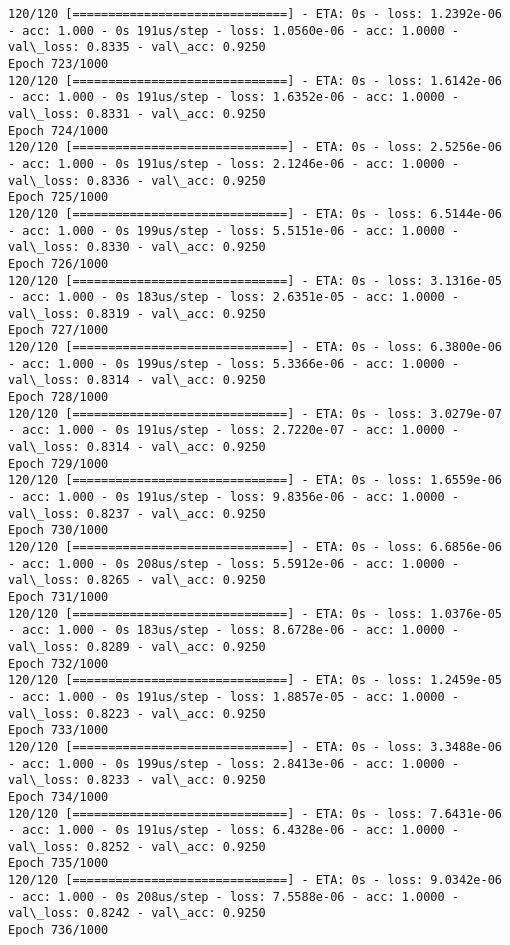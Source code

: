 \documentclass[11pt]{article}
\begin{document}
\begin{Verbatim}[commandchars=\\\{\}]
120/120 [==============================] - ETA: 0s - loss: 1.2392e-06 - acc: 1.000 - 0s 191us/step - loss: 1.0560e-06 - acc: 1.0000 - val\_loss: 0.8335 - val\_acc: 0.9250
Epoch 723/1000
120/120 [==============================] - ETA: 0s - loss: 1.6142e-06 - acc: 1.000 - 0s 191us/step - loss: 1.6352e-06 - acc: 1.0000 - val\_loss: 0.8331 - val\_acc: 0.9250
Epoch 724/1000
120/120 [==============================] - ETA: 0s - loss: 2.5256e-06 - acc: 1.000 - 0s 191us/step - loss: 2.1246e-06 - acc: 1.0000 - val\_loss: 0.8336 - val\_acc: 0.9250
Epoch 725/1000
120/120 [==============================] - ETA: 0s - loss: 6.5144e-06 - acc: 1.000 - 0s 199us/step - loss: 5.5151e-06 - acc: 1.0000 - val\_loss: 0.8330 - val\_acc: 0.9250
Epoch 726/1000
120/120 [==============================] - ETA: 0s - loss: 3.1316e-05 - acc: 1.000 - 0s 183us/step - loss: 2.6351e-05 - acc: 1.0000 - val\_loss: 0.8319 - val\_acc: 0.9250
Epoch 727/1000
120/120 [==============================] - ETA: 0s - loss: 6.3800e-06 - acc: 1.000 - 0s 199us/step - loss: 5.3366e-06 - acc: 1.0000 - val\_loss: 0.8314 - val\_acc: 0.9250
Epoch 728/1000
120/120 [==============================] - ETA: 0s - loss: 3.0279e-07 - acc: 1.000 - 0s 191us/step - loss: 2.7220e-07 - acc: 1.0000 - val\_loss: 0.8314 - val\_acc: 0.9250
Epoch 729/1000
120/120 [==============================] - ETA: 0s - loss: 1.6559e-06 - acc: 1.000 - 0s 191us/step - loss: 9.8356e-06 - acc: 1.0000 - val\_loss: 0.8237 - val\_acc: 0.9250
Epoch 730/1000
120/120 [==============================] - ETA: 0s - loss: 6.6856e-06 - acc: 1.000 - 0s 208us/step - loss: 5.5912e-06 - acc: 1.0000 - val\_loss: 0.8265 - val\_acc: 0.9250
Epoch 731/1000
120/120 [==============================] - ETA: 0s - loss: 1.0376e-05 - acc: 1.000 - 0s 183us/step - loss: 8.6728e-06 - acc: 1.0000 - val\_loss: 0.8289 - val\_acc: 0.9250
Epoch 732/1000
120/120 [==============================] - ETA: 0s - loss: 1.2459e-05 - acc: 1.000 - 0s 191us/step - loss: 1.8857e-05 - acc: 1.0000 - val\_loss: 0.8223 - val\_acc: 0.9250
Epoch 733/1000
120/120 [==============================] - ETA: 0s - loss: 3.3488e-06 - acc: 1.000 - 0s 199us/step - loss: 2.8413e-06 - acc: 1.0000 - val\_loss: 0.8233 - val\_acc: 0.9250
Epoch 734/1000
120/120 [==============================] - ETA: 0s - loss: 7.6431e-06 - acc: 1.000 - 0s 191us/step - loss: 6.4328e-06 - acc: 1.0000 - val\_loss: 0.8252 - val\_acc: 0.9250
Epoch 735/1000
120/120 [==============================] - ETA: 0s - loss: 9.0342e-06 - acc: 1.000 - 0s 208us/step - loss: 7.5588e-06 - acc: 1.0000 - val\_loss: 0.8242 - val\_acc: 0.9250
Epoch 736/1000

\end{Verbatim}
\end{document}
